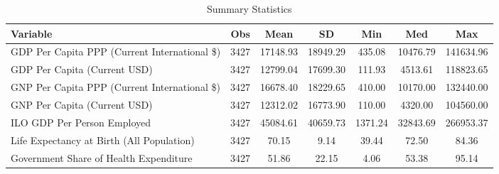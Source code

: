 \begin{table}
\centering
\caption{Summary Statistics}
\label{Sum_Stats}
\begin{tabular}{lcccccc}
\toprule
                                    Variable &  Obs &     Mean &       SD &     Min &      Med &       Max \\
\midrule
GDP Per Capita PPP (Current International \$) & 3427 & 17148.93 & 18949.29 & 435.08 & 10476.79 & 141634.96 \\
GDP Per Capita (Current USD) & 3427 & 12799.04 & 17699.30 & 111.93 & 4513.61 & 118823.65 \\
GNP Per Capita PPP (Current International \$) & 3427 & 16678.40 & 18229.65 & 410.00 & 10170.00 & 132440.00 \\
GNP Per Capita (Current USD) & 3427 & 12312.02 & 16773.90 & 110.00 & 4320.00 & 104560.00 \\
ILO GDP Per Person Employed & 3427 & 45084.61 & 40659.73 & 1371.24 & 32843.69 & 266953.37 \\
Life Expectancy at Birth (All Population) & 3427 & 70.15 & 9.14 & 39.44 & 72.50 & 84.36 \\
Government Share of Health Expenditure & 3427 & 51.86 & 22.15 & 4.06 & 53.38 & 95.14 \\
\bottomrule
\end{tabular}
\end{table}
